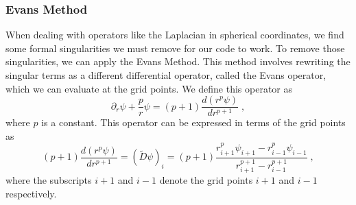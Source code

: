 \subsubsection{Evans Method}
When dealing with operators like the Laplacian in spherical coordinates, we find some formal singularities we must remove for our code to work. To remove those singularities, we can apply the Evans Method. This method involves rewriting the singular terms as a different differential operator, called the Evans operator, which we can evaluate at the grid points. We define this operator as
%
\begin{equation}
    \partial_r \psi + \frac{p}{r}\psi = (p+1) \frac{d(r^p \psi)}{dr^{p+1}}\;,
\end{equation}
%
where $p$ is a constant. This operator can be expressed in terms of the grid points as 
%
\begin{equation}
    (p+1) \frac{d(r^p \psi)}{dr^{p+1}}=(\tilde{D}\psi)_i = (p+1)\frac{r^p_{i+1}\psi_{i+1}-r^p_{i-1}\psi_{i-1}}{r^{p+1}_{i+1}-r^{p+1}_{i-1}}\;,
\end{equation}
%
where the subscripts $i+1$ and $i-1$ denote the grid points $i+1$ and $i-1$ respectively.